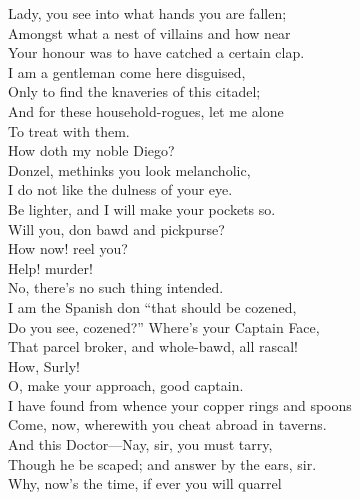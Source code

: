 \documentclass[a4paper,oneside,12pt]{memoir}
\begin{document}
\begin{drama*}
\surlyspeaks Lady, you see into what hands you are fallen;\\
Amongst what a nest of villains and how near\\
Your honour was to have catched a certain clap.\\
I am a gentleman come here disguised,\\
Only to find the knaveries of this citadel;\\
And for these household-rogues, let me alone\\
To treat with them.\\
\subtlespeaks {} How doth my noble Diego?\\
Donzel, methinks you look melancholic,\\
I do not like the dulness of your eye.\\
Be lighter, and I will make your pockets so.\\
\surlyspeaks Will you, don bawd and pickpurse?\\
 How now! reel you?\\
\subtlespeaks Help! murder!\\
\surlyspeaks {} No, there's no such thing intended.\\
I am the Spanish don ``that should be cozened,\\
Do you see, cozened?'' Where's your Captain Face,\\
That parcel broker, and whole-bawd, all rascal!\\
\facespeaks How, Surly!\\
\surlyspeaks {} O, make your approach, good captain.\\
I have found from whence your copper rings and spoons\\
Come, now, wherewith you cheat abroad in taverns.\\
And this Doctor---Nay, sir, you must tarry,\\
Though he be scaped; and answer by the ears, sir.\\
\facespeaks Why, now's the time, if ever you will quarrel\\

\end{drama*}
\end{document}

